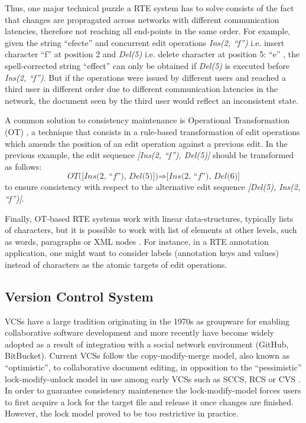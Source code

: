 \documentclass{sig-alternate}
\begin{document}
Thus, one major technical puzzle a RTE system has to solve consists of the fact that changes
are propragated across networks with different communication latencies, therefore not
reaching all end-points in the same order. For example, given
the string ``efecte'' and concurrent edit operations \textit{Ins(2, ``f'')} \textemdash i.e.
insert character ``f'' at position 2 \textemdash and \textit{Del(5)} \textemdash i.e.
delete character at position 5: ``e'' \textemdash, the spell-corrected string ``effect''
can only be obtained if \textit{Del(5)} is executed before \textit{Ins(2, ``f'')}.
But if the operations were issued by different users and reached a third user in different
order due to different communication latencies in the network,
the document seen by the third user would reflect an inconsistent state.

A common solution to consistency maintenance is Operational Transformation
(OT) \cite{SuClarence}, a technique that consists in a rule-based transformation
of edit operations which amends the position of an edit operation against a previous edit.
In the previous example, the edit sequence \textit{[Ins(2, ``f''), Del(5)]} should be
transformed as follows:
\begin{equation*}
  \textit{OT([Ins(2, ``f''), Del(5)])} \Rightarrow \textit{[Ins(2, ``f''), Del(6)]}
\end{equation*}
to ensure consistency with respect to the alternative edit sequence
\textit{[Del(5), Ins(2, ``f'')]}.


Finally, OT-based RTE systems work with linear data-structures, typically lists of
characters, but it is possible to work with list of elements at other levels, such as words,
paragraphs or XML nodes \cite{Imine2009,SuClarence}. For instance, in a RTE annotation application,
one might want to consider labels (annotation keys and values) instead of characters as the
atomic targets of edit operations.


\subsection{Version Control System}\label{subsec:vcs}

VCSs have a large tradition originating in the 1970s as groupware for enabling collaborative
software development and more recently have become widely adopted as a result of
integration with a social network environment (GitHub, BitBucket).
Current VCSs follow the copy-modify-merge model, also known as ``optimistic'', to
collaborative document editing, in opposition to the ``pessimistic'' lock-modify-unlock model
in use among early VCSs such as SCCS, RCS or CVS \cite{Loeliger2012}.
In order to guarantee consistency maintenence the lock-modify-model forces users to first
acquire a lock for the target file and release it once changes are finished. However, 
the lock model proved to be too restrictive in practice.
\end{document}
